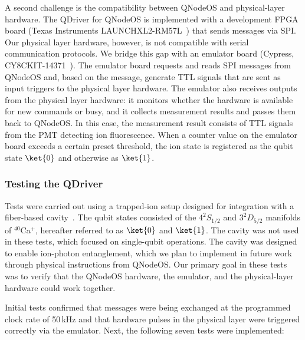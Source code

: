 A second challenge is the compatibility between \ac{QNodeOS} and physical-layer hardware. The \ac{QDriver} for \ac{QNodeOS} is implemented with a development \ac{FPGA} board (Texas Instruments LAUNCHXL2-RM57L~\cite{ti_launchxl2_rm57l_2024}) that sends messages via \ac{SPI}. Our physical layer hardware, however, is not compatible with serial communication protocols. We bridge this gap with an emulator board (Cypress, CY8CKIT-14371~\cite{infineon_cy8ckit_143a_2024}). The emulator board requests and reads \ac{SPI} messages from \ac{QNodeOS} and, based on the message, generate \ac{TTL} signals that are sent as input triggers to the physical layer hardware. The emulator also receives outputs from the physical layer hardware: it monitors whether the hardware is available for new commands or busy, and it collects measurement results and passes them back to \ac{QNodeOS}.
In this case, the measurement result consists of \ac{TTL} signals from the \ac{PMT} detecting ion fluorescence. When a counter value on the emulator board exceeds a certain preset threshold, the ion state is registered as the qubit state $\ket{0}$ and otherwise as $\ket{1}$.

\subsubsection{Testing the QDriver}

Tests were carried out using a trapped-ion setup designed for integration with a fiber-based cavity~\cite{teller2023integrating, teller2021heating}. The qubit states consisted of the $4^2 S_{1/2}$ and $3^2 D_{5/2}$ manifolds of $^{40}$Ca$^+$, hereafter referred to as $\ket{0}$ and $\ket{1}$. The cavity was not used in these tests, which focused on single-qubit operations. The cavity was designed to enable ion-photon entanglement, which we plan to implement in future work through physical instructions from \ac{QNodeOS}. Our primary goal in these tests was to verify that the \ac{QNodeOS} hardware, the emulator, and the physical-layer hardware could work together.

Initial tests confirmed that messages were being exchanged at the programmed clock rate of 50\,kHz and that hardware pulses in the physical layer were triggered correctly via the emulator. Next, the following seven tests were implemented:

